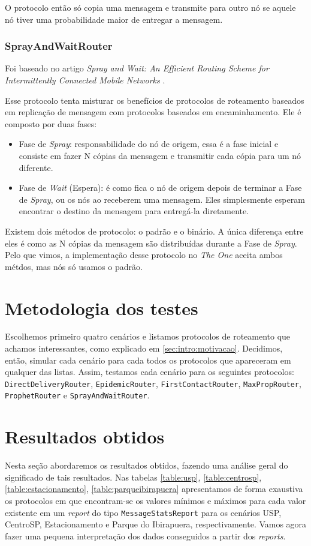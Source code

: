 \documentclass[conference]{IEEEtran}
\begin{document}
O protocolo então só copia uma mensagem e transmite para outro nó se aquele nó tiver uma probabilidade maior de entregar a mensagem.

\subsubsection{SprayAndWaitRouter}
Foi baseado no artigo \textit{Spray and Wait: An Efficient Routing Scheme for Intermittently Connected Mobile Networks} \cite{SprayAndWaitRouter:original}.

Esse protocolo tenta misturar os benefícios de protocolos de roteamento baseados em replicação de mensagem com protocolos baseados em encaminhamento. Ele é composto por duas fases:
\begin{itemize}
  \item Fase de \textit{Spray}: responsabilidade do nó de origem, essa é a fase inicial e consiste em fazer N cópias da mensagem e transmitir cada cópia para um nó diferente.
  \item Fase de \textit{Wait} (Espera): é como fica o nó de origem depois de terminar a Fase de \textit{Spray}, ou os nós ao receberem uma mensagem. Eles simplesmente esperam encontrar o destino da mensagem para entregá-la diretamente.
\end{itemize}

Existem dois métodos de protocolo: o padrão e o binário. A única diferença entre eles é como as N cópias da mensagem são distribuídas durante a Fase de \textit{Spray}. Pelo que vimos, a implementação desse protocolo no \emph{The One} aceita ambos métdos, mas nós só usamos o padrão.

\section{Metodologia dos testes}
Escolhemos primeiro quatro cenários e listamos protocolos de roteamento que achamos interessantes, como explicado em \ref{sec:intro:motivacao}. Decidimos, então, simular cada cenário para cada todos os protocolos que apareceram em qualquer das listas. Assim, testamos cada cenário para os seguintes protocolos: \texttt{DirectDeliveryRouter}, \texttt{EpidemicRouter}, \texttt{FirstContactRouter}, \texttt{MaxPropRouter}, \texttt{ProphetRouter} e \texttt{SprayAndWaitRouter}.


\section{Resultados obtidos}
Nesta seção abordaremos os resultados obtidos, fazendo uma análise geral do significado de tais resultados. Nas tabelas \ref{table:usp}, \ref{table:centrosp}, \ref{table:estacionamento}, \ref{table:parqueibirapuera} apresentamos de forma exaustiva os protocolos em que encontram-se os valores mínimos e máximos para cada valor existente em um \textit{report} do tipo \texttt{MessageStatsReport} para os cenários USP, CentroSP, Estacionamento e Parque do Ibirapuera, respectivamente. Vamos agora fazer uma pequena interpretação dos dados conseguidos a partir dos \textit{reports}.
\end{document}
